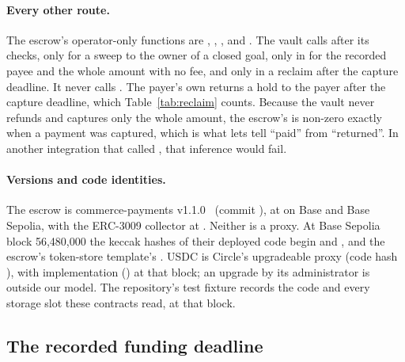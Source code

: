 \paragraph{Every other route.} The escrow's operator-only functions are , , ,  and
. The vault calls  after its checks,  only for a sweep to the owner of a closed goal, 
only in  for the recorded payee and the whole amount with no fee, and  only in a reclaim after the capture deadline. It
never calls . The payer's own  returns a hold to the payer after the capture deadline, which Table~\ref{tab:reclaim}
counts. Because the vault never refunds and captures only the whole amount, the escrow's  is non-zero exactly when a
payment was captured, which is what lets  tell ``paid'' from ``returned''. In another integration that called
, that inference would fail.

\paragraph{Versions and code identities.} The escrow is commerce-payments v1.1.0~\cite{commercepayments} (commit ), at
 on Base and Base Sepolia, with the ERC-3009 collector at . Neither is a proxy. At Base Sepolia
block 56{,}480{,}000 the keccak hashes of their deployed code begin  and , and the escrow's token-store
template's . USDC is Circle's upgradeable proxy (code hash ), with implementation 
() at that block; an upgrade by its administrator is outside our model. The repository's test fixture records the code and
every storage slot these contracts read, at that block.

\subsection{The recorded funding deadline}
\label{sec:hold}

